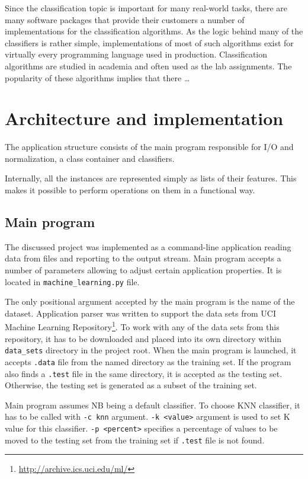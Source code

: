 \documentclass{llncs}
\begin{document}

Since the classification topic is important for many real-world tasks, there are many software packages that provide their customers a number of implementations for the classification algorithms. As the logic behind many of the classifiers is rather simple, implementations of most of such algorithms exist for virtually every programming language used in production. Classification algorithms are studied in academia and often used as the lab assignments. The popularity of these algorithms implies that there \ldots

\section{Architecture and implementation}

The application structure consists of the main program responsible for I/O and normalization, a class container and classifiers. 

Internally, all the instances are represented simply as lists of their features. This makes it possible to perform operations on them in a functional way.

\subsection{Main program}

The discussed project was implemented as a command-line application reading data from files and reporting to the output stream. Main program accepts a number of parameters allowing to adjust certain application properties. It is located in \texttt{machine\_learning.py} file.

The only positional argument accepted by the main program is the name of the dataset. Application parser was written to support the data sets from UCI Machine Learning Repository\footnote{\url{http://archive.ics.uci.edu/ml/}}. To work with any of the data sets from this repository, it has to be downloaded and placed into its own directory within \texttt{data\_sets} directory in the project root. When the main program is launched, it accepts \texttt{.data} file from the named directory as the training set. If the program also finds a \texttt{.test} file in the same directory, it is accepted as the testing set. Otherwise, the testing set is generated as a subset of the training set.

Main program assumes NB being a default classifier. To choose KNN classifier, it has to be called with \texttt{-c knn} argument. \texttt{-k <value>} argument is used to set K value for this classifier. \texttt{-p <percent>} specifies a percentage of values to be moved to the testing set from the training set if \texttt{.test} file is not found.
\end{document}
